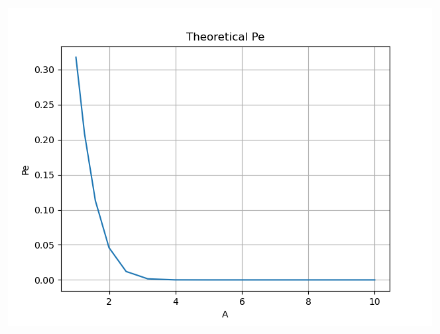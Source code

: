 \documentclass[journal,12pt,twocolumn]{IEEEtran}
\begin{document}
\begin{enumerate}
\begin{figure}[h]
\includegraphics[width=\columnwidth]{Figure/7_1_7.png}
    \label{fig:Theoretical Pe}
\end{figure} 
\end{enumerate}
\end{document}
